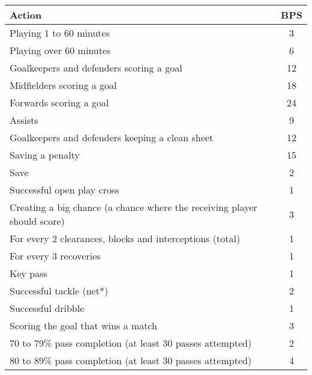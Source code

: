 \begin{table}[H]
\centering
\begin{tabular}{|l|c|}
\hline
\textbf{Action}                                                                   & \textbf{BPS} \\
\hline
Playing 1 to 60 minutes                                                  & 3   \\
Playing over 60 minutes                                                  & 6   \\
Goalkeepers and defenders scoring a goal                                 & 12  \\
Midfielders scoring a goal                                               & 18  \\
Forwards scoring a goal                                                  & 24  \\
Assists                                                                  & 9   \\
Goalkeepers and defenders keeping a clean sheet                          & 12  \\
Saving a penalty                                                         & 15  \\
Save                                                                     & 2   \\
Successful open play cross                                               & 1   \\
Creating a big chance (a chance where the receiving player should score) & 3   \\
For every 2 clearances, blocks and interceptions (total)                 & 1   \\
For every 3 recoveries                                                   & 1   \\
Key pass                                                                 & 1   \\
Successful tackle (net*)                                                 & 2   \\
Successful dribble                                                       & 1   \\
Scoring the goal that wins a match                                       & 3   \\
70 to 79\% pass completion (at least 30 passes attempted)                & 2   \\
80 to 89\% pass completion (at least 30 passes attempted)                & 4   \\

\end{tabular}
\end{table}
